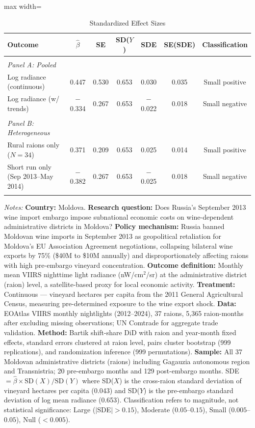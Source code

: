 \begin{table}[t]
\centering
\caption{Standardized Effect Sizes}
\label{tab:sde}
\begin{adjustbox}{max width=\textwidth}
\begin{tabular}{lcccccc}
\hline\hline
Outcome & $\hat{\beta}$ & SE & SD($Y$) & SDE & SE(SDE) & Classification \\
\hline
\\[-1em]
\textit{Panel A: Pooled} & & & & & & \\
Log radiance (continuous) & 0.447 & 0.530 & 0.653 & 0.030 & 0.035 & Small positive \\
Log radiance (w/ trends) & $-$0.334 & 0.267 & 0.653 & $-$0.022 & 0.018 & Small negative \\
\\[-0.5em]
\textit{Panel B: Heterogeneous} & & & & & & \\
Rural raions only ($N=34$) & 0.371 & 0.209 & 0.653 & 0.025 & 0.014 & Small positive \\
Short run only (Sep 2013--May 2014) & $-$0.382 & 0.267 & 0.653 & $-$0.025 & 0.018 & Small negative \\
\\[-0.5em]
\hline\hline
\end{tabular}
\end{adjustbox}
\begin{tablenotes}
\item \textit{Notes:} \textbf{Country:} Moldova. \textbf{Research question:} Does Russia's September 2013 wine import embargo impose subnational economic costs on wine-dependent administrative districts in Moldova? \textbf{Policy mechanism:} Russia banned Moldovan wine imports in September 2013 as geopolitical retaliation for Moldova's EU Association Agreement negotiations, collapsing bilateral wine exports by 75\% (\$40M to \$10M annually) and disproportionately affecting raions with high pre-embargo vineyard concentration. \textbf{Outcome definition:} Monthly mean VIIRS nighttime light radiance (nW/cm$^2$/sr) at the administrative district (raion) level, a satellite-based proxy for local economic activity. \textbf{Treatment:} Continuous --- vineyard hectares per capita from the 2011 General Agricultural Census, measuring pre-determined exposure to the wine export shock. \textbf{Data:} EOAtlas VIIRS monthly nightlights (2012--2024), 37 raions, 5,365 raion-months after excluding missing observations; UN Comtrade for aggregate trade validation. \textbf{Method:} Bartik shift-share DiD with raion and year-month fixed effects, standard errors clustered at raion level, pairs cluster bootstrap (999 replications), and randomization inference (999 permutations). \textbf{Sample:} All 37 Moldovan administrative districts (raions) including Gagauzia autonomous region and Transnistria; 20 pre-embargo months and 129 post-embargo months. SDE $= \hat{\beta} \times \text{SD}(X) / \text{SD}(Y)$ where SD($X$) is the cross-raion standard deviation of vineyard hectares per capita (0.043) and SD($Y$) is the pre-embargo standard deviation of log mean radiance (0.653). Classification refers to magnitude, not statistical significance: Large ($|$SDE$| > 0.15$), Moderate ($0.05$--$0.15$), Small ($0.005$--$0.05$), Null ($< 0.005$).
\end{tablenotes}
\end{table}
